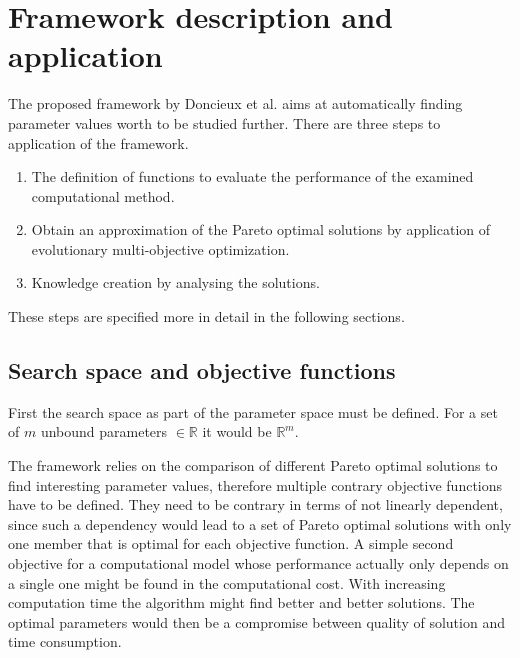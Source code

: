 \documentclass[12pt,twoside]{article}
\theoremstyle{plain}
\theoremstyle{definition}
\theoremstyle{remark}
\begin{document}
\section{Framework description and application}
\label{sec:model}
The proposed framework by Doncieux et al. \cite{doncieux2015multi} aims at automatically finding parameter values worth to be studied further.
There are three steps to application of the framework.
\begin{enumerate}
	\item The definition of functions to evaluate the performance of the examined computational method.
	\item Obtain an approximation of the Pareto optimal solutions by application of evolutionary multi-objective optimization.
	\item Knowledge creation by analysing the solutions.
\end{enumerate}
These steps are specified more in detail in the following sections.

\subsection{Search space and objective functions}
First the search space as part of the parameter space must be defined. For a set of $m$ unbound parameters $\in \mathbb{R}$ it would be $\mathbb{R}^m$. 

The framework relies on the comparison of different Pareto optimal solutions to find interesting parameter values, therefore multiple contrary objective functions have to be defined.
They need to be contrary in terms of not linearly dependent, since such a dependency would lead to a set of Pareto optimal solutions with only one member that is optimal for each objective function.
A simple second objective for a computational model whose performance actually only depends on a single one might be found in the computational cost.
With increasing computation time the algorithm might find better and better solutions. The optimal parameters would then be a compromise between quality of solution and time consumption.
\end{document}
